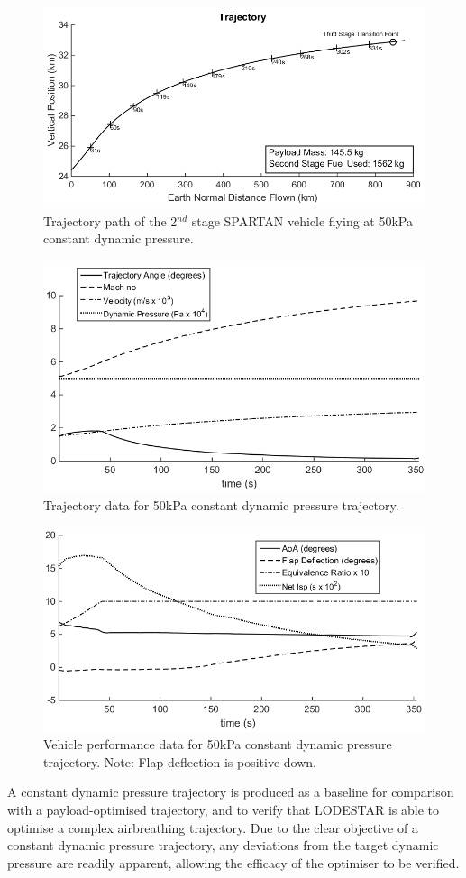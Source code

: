 \documentclass[]{aiaa-tc}
\begin{document}
\begin{figure}[H]
	\centering
	\includegraphics[width=.7\linewidth]{Constq}
	\caption{Trajectory path of the 2$^{nd}$ stage SPARTAN vehicle flying at 50kPa constant dynamic pressure.}
	\label{fig:constq}
\end{figure}
\begin{figure}[ht]
	\centering	
	\includegraphics[width=.6\linewidth]{Constq-Aero}
	\caption{Trajectory data for 50kPa constant dynamic pressure trajectory.}
	\label{fig:constq aero}
\end{figure}
\begin{figure}[ht]
	\centering
	\includegraphics[width=.6\linewidth]{Constq-Vehicle}
	\caption{Vehicle performance data for 50kPa constant dynamic pressure trajectory. Note: Flap deflection is positive down.}
	\label{fig:constq vehicle}
\end{figure}




A constant dynamic pressure trajectory is produced as a baseline for comparison with a payload-optimised trajectory, and to verify that LODESTAR is able to optimise a complex airbreathing trajectory. Due to the clear objective of a constant dynamic pressure trajectory, any deviations from the target dynamic pressure are readily apparent, allowing the efficacy of the optimiser to be verified. 
\end{document}
